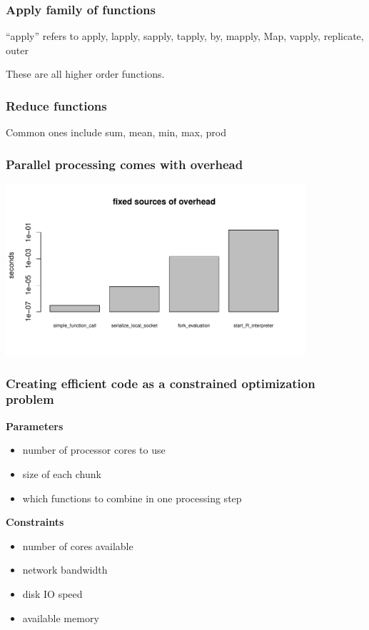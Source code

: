 \documentclass{beamer}
\begin{document}
\begin{frame}

    \frametitle{Apply family of functions}

    ``apply'' refers to apply, lapply, sapply, tapply, by, mapply, Map,
    vapply, replicate, outer

    These are all higher order functions.

    \end{frame}
\begin{frame}

    \frametitle{Reduce functions}

    Common ones include sum, mean, min, max, prod

\end{frame}
\begin{frame}

\frametitle{Parallel processing comes with overhead}

    \centerline{\includegraphics[height=2.5in]{../compute_times/overhead}}



\end{frame}
\begin{frame}


    \frametitle{Creating efficient code as a constrained optimization
    problem}

\textbf{Parameters}
\begin{itemize}
    \item number of processor cores to use
    \item size of each chunk
    \item which functions to combine in one processing step
\end{itemize}

\textbf{Constraints}
\begin{itemize}
    \item number of cores available
    \item network bandwidth
    \item disk IO speed
    \item available memory
\end{itemize}

\end{frame}
\end{document}
